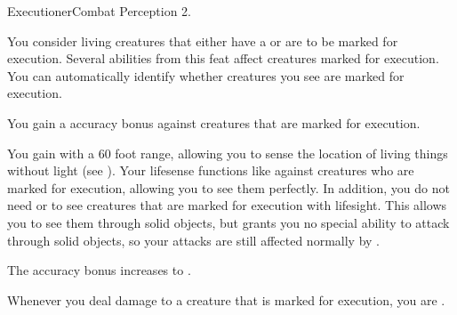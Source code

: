   \begin{feat}{Executioner}{Combat}
    \featpres Perception 2.

     You consider living creatures that either have a  or are  to be marked for execution.
    Several abilities from this feat affect creatures marked for execution.
    You can automatically identify whether creatures you see are marked for execution.

     You gain a  accuracy bonus against creatures that are marked for execution.

     You gain  with a 60 foot range, allowing you to sense the location of living things without light (see ).
    Your lifesense functions like  against creatures who are marked for execution, allowing you to see them perfectly.
    In addition, you do not need  or  to see creatures that are marked for execution with lifesight.
    This allows you to see them through solid objects, but grants you no special ability to attack through solid objects, so your attacks are still affected normally by .

     The accuracy bonus increases to .

     Whenever you deal damage to a creature that is marked for execution, you are \briefly \honed.
  \end{feat}

